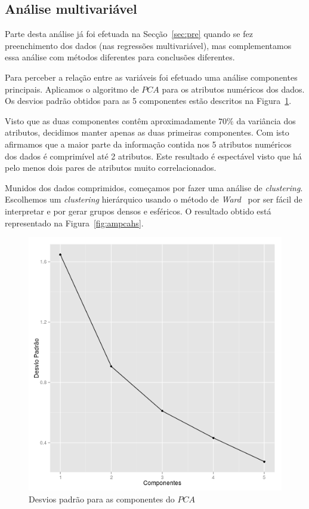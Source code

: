 \documentclass[10pt, conference, compsocconf]{IEEEtran}
\begin{document}
\subsection{Análise multivariável}
Parte desta análise já foi efetuada na Secção~\ref{sec:pre} quando se
fez preenchimento dos dados (nas regressões multivariável), mas
complementamos essa análise com métodos diferentes para conclusões
diferentes.

Para perceber a relação entre as variáveis foi efetuado uma análise
componentes principais. Aplicamos o algoritmo de $PCA$ para os
atributos numéricos dos dados. Os desvios padrão obtidos para as 5
componentes estão descritos na Figura~\ref{fig:ampca}.

Visto que as duas componentes contêm aproximadamente $70\%$ da
variância dos atributos, decidimos manter apenas as duas primeiras
componentes. Com isto afirmamos que a maior parte da informação
contida nos 5 atributos numéricos dos dados é comprimível até 2
atributos. Este resultado é espectável visto que há pelo menos dois
pares de atributos muito correlacionados.

Munidos dos dados comprimidos, começamos por fazer uma análise de
\textit{clustering}. Escolhemos um \textit{clustering} hierárquico
usando o método de \textit{Ward}~\cite{ward1963hierarchical} por ser
fácil de interpretar e por gerar grupos densos e esféricos. O
resultado obtido está representado na Figura~\ref{fig:ampcahs}.

\begin{figure}[H]
  \centering
  \includegraphics[scale=0.4]{img/amv_pcasd.png}
  \caption{Desvios padrão para as componentes do $PCA$}
  \label{fig:ampca}
\end{figure}
\end{document}
